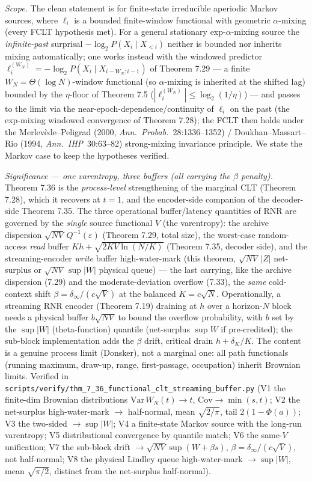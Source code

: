 \documentclass[
]{article}
\begin{document}
\emph{Scope.} The clean statement is for finite-state irreducible aperiodic Markov sources,
where $\ell_i$ is a bounded finite-window functional with geometric $\alpha$-mixing (every
FCLT hypothesis met). For a general stationary exp-$\alpha$-mixing source the
\emph{infinite-past} surprisal $-\log_2 P(X_i\mid X_{<i})$ neither is bounded nor inherits
mixing automatically; one works instead with the windowed predictor $\ell_i^{(W_N)}=-\log_2
P(X_i\mid X_{i-W_N:i-1})$ of Theorem 7.29 --- a finite $W_N=\Theta(\log N)$-window functional
(so $\alpha$-mixing is inherited at the shifted lag) bounded by the $\eta$-floor of
Theorem 7.5 ($|\ell_i^{(W_N)}|\le\log_2(1/\eta)$) --- and passes to the limit via the
near-epoch-dependence/continuity of $\ell_i$ on the past (the exp-mixing windowed convergence
of Theorem 7.28); the FCLT then holds under the Merlev\`ede--Peligrad (2000, \emph{Ann.\
Probab.}\ 28:1336--1352) / Doukhan--Massart--Rio (1994, \emph{Ann.\ IHP}\ 30:63--82)
strong-mixing invariance principle. We state the Markov case to keep the hypotheses verified.

\emph{Significance --- one varentropy, three buffers (all carrying the $\beta$ penalty).}
Theorem 7.36 is the \emph{process-level} strengthening of the marginal CLT (Theorem 7.28),
which it recovers at $t=1$, and the encoder-side companion of the decoder-side Theorem 7.35.
The three operational buffer/latency quantities of RNR are governed by the \emph{single}
source functional $V$ (the varentropy): the archive dispersion $\sqrt{NV}\,Q^{-1}(\varepsilon)$
(Theorem 7.29, total size), the worst-case random-access \emph{read} buffer
$Kh+\sqrt{2KV\ln(N/K)}$ (Theorem 7.35, decoder side), and the streaming-encoder \emph{write}
buffer high-water-mark (this theorem, $\sqrt{NV}\,|Z|$ net-surplus or $\sqrt{NV}\,\sup|W|$
physical queue) --- the last carrying, like the archive dispersion (7.29) and the
moderate-deviation overflow (7.33), the \emph{same} cold-context shift $\beta=\delta_\infty/
(c\sqrt V)$ at the balanced $K=c\sqrt N$. Operationally, a streaming RNR encoder (Theorem 7.19)
draining at $h$ over a horizon-$N$ block needs a physical buffer $b\sqrt{NV}$ to bound the
overflow probability, with $b$ set by the $\sup|W|$ (theta-function) quantile (net-surplus
$\sup W$ if pre-credited); the sub-block implementation adds the $\beta$ drift, critical drain
$h+\delta_K/K$. The content is a genuine process limit (Donsker), not a marginal one: all path
functionals (running maximum, draw-up, range, first-passage, occupation) inherit Brownian
limits. Verified in \texttt{scripts/verify/thm\_7\_36\_functional\_clt\_streaming\_buffer.py}
(V1 the finite-dim Brownian distributions $\mathrm{Var}\,W_N(t)\to t$, $\mathrm{Cov}\to
\min(s,t)$; V2 the net-surplus high-water-mark $\to$ half-normal, mean $\sqrt{2/\pi}$, tail
$2(1-\Phi(a))$; V3 the two-sided $\to\sup|W|$; V4 a finite-state Markov source with the
long-run varentropy; V5 distributional convergence by quantile match; V6 the same-$V$
unification; V7 the sub-block drift $\to\sqrt{NV}\sup(W+\beta s)$, $\beta=\delta_\infty/
(c\sqrt V)$, not half-normal; V8 the physical Lindley queue high-water-mark $\to\sup|W|$,
mean $\sqrt{\pi/2}$, distinct from the net-surplus half-normal).
\end{document}
